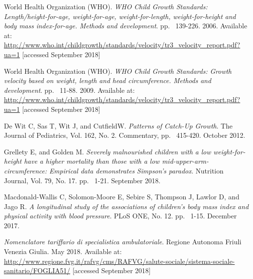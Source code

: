 \begin{thebibliography}{50}
  World Health Organization (WHO).
  \textit{WHO Child Growth Standards: Length/height-for-age, weight-for-age, weight-for-length, weight-for-height and body mass index-for-age. Methods and development}.
  pp. ~139-226.
  2006.
  Available at: \url{http://www.who.int/childgrowth/standards/velocity/tr3_velocity_report.pdf?ua=1} [accessed September 2018]
   
  World Health Organization (WHO).
  \textit{WHO Child Growth Standards: Growth velocity based on weight, length and head circumference. Methods and development}.
  pp. ~11-88.
  2009.
  Available at: \url{http://www.who.int/childgrowth/standards/velocity/tr3_velocity_report.pdf?ua=1} [accessed September 2018]
   
  De Wit C, Sas T, Wit J, and CutfieldW.
  \textit{Patterns of Catch-Up Growth}.
  The Journal of Pediatrics, Vol. 162, No. 2.
  Commentary, pp. ~415-420.
  October 2012.
  
  Grellety E, and Golden M.
  \textit{Severely malnourished children with a low weight-for-height have a higher mortality than those with a low mid-upper-arm-circumference: Empirical data demonstrates Simpson’s paradox}.
  Nutrition Journal, Vol. 79, No. 17.
  pp. ~1-21.
  September 2018.
  
  Macdonald-Wallis C, Solomon-Moore E, Sebire S, Thompson J, Lawlor D, and Jago R.
  \textit{A longitudinal study of the associations of children’s body mass index and physical activity with blood pressure}.
  PLoS ONE, No. 12.
  pp. ~1-15.
  December 2017.
  
  \textit{Nomenclatore tariffario di specialistica ambulatoriale}.
  Regione Autonoma Friuli Venezia Giulia.
  May 2018.
  Available at: \url{http://www.regione.fvg.it/rafvg/cms/RAFVG/salute-sociale/sistema-sociale-sanitario/FOGLIA51/} [accessed September 2018]

\end{thebibliography}